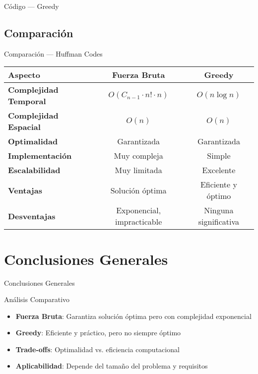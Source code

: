 \documentclass[aspectratio=169]{beamer}
\begin{document}
\begin{frame}{Código — Greedy}
\end{frame}

\subsection{Comparación}
\begin{frame}{Comparación — Huffman Codes}
  \begin{table}[h]
  \centering
  \begin{tabular}{|l|c|c|}
  \hline
  \textbf{Aspecto} & \textbf{Fuerza Bruta} & \textbf{Greedy} \\
  \hline
  \textbf{Complejidad Temporal} & $O(C_{n-1} \cdot n! \cdot n)$ & $O(n \log n)$ \\
  \textbf{Complejidad Espacial} & $O(n)$ & $O(n)$ \\
  \textbf{Optimalidad} & Garantizada & Garantizada \\
  \textbf{Implementación} & Muy compleja & Simple \\
  \textbf{Escalabilidad} & Muy limitada & Excelente \\
  \hline
  \textbf{Ventajas} & Solución óptima & Eficiente y óptimo \\
  \textbf{Desventajas} & Exponencial, impracticable & Ninguna significativa \\
  \hline
  \end{tabular}
  \end{table}
\end{frame}

\section*{Conclusiones Generales}
\begin{frame}{Conclusiones Generales}
  \begin{block}{Análisis Comparativo}
    \begin{itemize}
      \item \textbf{Fuerza Bruta}: Garantiza solución óptima pero con complejidad exponencial
      \item \textbf{Greedy}: Eficiente y práctico, pero no siempre óptimo
      \item \textbf{Trade-offs}: Optimalidad vs. eficiencia computacional
      \item \textbf{Aplicabilidad}: Depende del tamaño del problema y requisitos
    \end{itemize}
  \end{block}
\end{frame}
\end{document}
